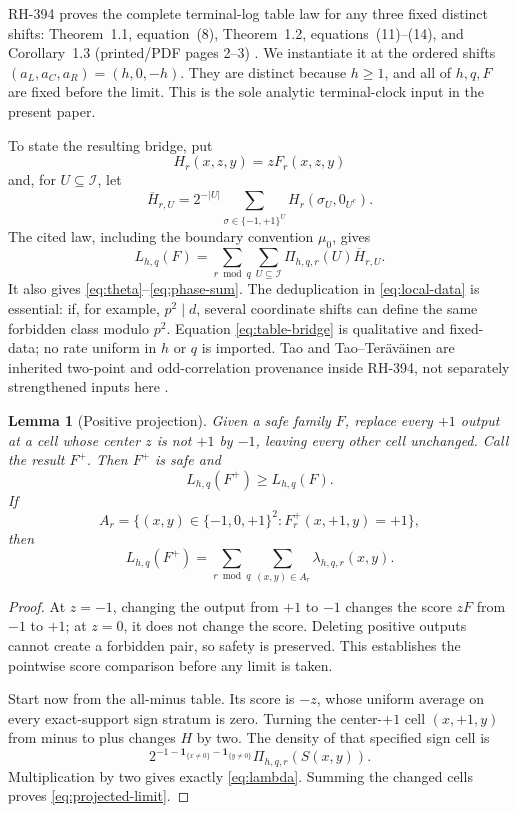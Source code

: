 \documentclass[11pt]{article}
\newtheorem{lemma}[theorem]{Lemma}
\theoremstyle{definition}
\theoremstyle{remark}
\newcommand{\mob}{\mu}
\newcommand{\ind}{\mathbf 1}
\newcommand{\T}{\{-1,0,+1\}}
\begin{document}
RH-394 proves the complete terminal-log table law for any three fixed
distinct shifts: Theorem~1.1, equation~(8), Theorem~1.2,
equations~(11)--(14), and Corollary~1.3 (printed/PDF pages 2--3)
\cite{RH394}.  We instantiate it at the ordered shifts
\((a_L,a_C,a_R)=(h,0,-h)\).  They are distinct because \(h\geq1\), and
all of \(h,q,F\) are fixed before the limit.  This is the sole analytic
terminal-clock input in the present paper.

To state the resulting bridge, put
\[
 H_r(x,z,y)=zF_r(x,z,y)
\]
and, for \(U\subseteq\mathcal I\), let
\[
 \overline H_{r,U}=2^{-|U|}
 \sum_{\sigma\in\{-1,+1\}^{U}}H_r(\sigma_U,0_{U^c}).
\]
The cited law, including the boundary convention \(\mob_0\), gives
\begin{equation}
 L_{h,q}(F)=
 \sum_{r\bmod q}\sum_{U\subseteq\mathcal I}
 \Pi_{h,q,r}(U)\overline H_{r,U}.
 \label{eq:table-bridge}
\end{equation}
It also gives \eqref{eq:theta}--\eqref{eq:phase-sum}.  The
deduplication in \eqref{eq:local-data} is essential: if, for example,
\(p^2\mid d\), several coordinate shifts can define the same forbidden
class modulo \(p^2\).  Equation \eqref{eq:table-bridge} is qualitative
and fixed-data; no rate uniform in \(h\) or \(q\) is imported.  Tao and
Tao--Ter\"av\"ainen are inherited two-point and odd-correlation
provenance inside RH-394, not separately strengthened inputs here
\cite{Tao2016LogChowla,TaoTeravainen2019}.

\begin{lemma}[Positive projection]
\label{lem:projection}
Given a safe family \(F\), replace every \(+1\) output at a cell whose
center \(z\) is not \(+1\) by \(-1\), leaving every other cell unchanged.
Call the result \(F^+\).  Then \(F^+\) is safe and
\[
 L_{h,q}(F^+)\geq L_{h,q}(F).
\]
If
\begin{equation}
 A_r=\{(x,y)\in\T^2:F^+_r(x,+1,y)=+1\},
 \label{eq:relation}
\end{equation}
then
\begin{equation}
 L_{h,q}(F^+)=
 \sum_{r\bmod q}\sum_{(x,y)\in A_r}\lambda_{h,q,r}(x,y).
 \label{eq:projected-limit}
\end{equation}
\end{lemma}

\begin{proof}
At \(z=-1\), changing the output from \(+1\) to \(-1\) changes the score
\(zF\) from \(-1\) to \(+1\); at \(z=0\), it does not change the score.
Deleting positive outputs cannot create a forbidden pair, so safety is
preserved.  This establishes the pointwise score comparison before any
limit is taken.

Start now from the all-minus table.  Its score is \(-z\), whose uniform
average on every exact-support sign stratum is zero.  Turning the
center-\(+1\) cell \((x,+1,y)\) from minus to plus changes \(H\) by two.
The density of that specified sign cell is
\[
 2^{-1-\ind_{\{x\ne0\}}-\ind_{\{y\ne0\}}}
 \Pi_{h,q,r}(S(x,y)).
\]
Multiplication by two gives exactly \eqref{eq:lambda}.  Summing the
changed cells proves \eqref{eq:projected-limit}.
\end{proof}
\end{document}
